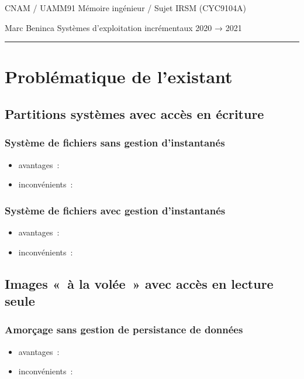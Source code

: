 \documentclass[12pt]{article}
\newcommand{\hr}{\rule{\textwidth}{1pt}}
\newenvironment{itmz}{\begin{itemize}
\setlength{\itemsep}{0em}
}{\end{itemize}}
\begin{document}
CNAM / UAMM91 \hfill Mémoire ingénieur / Sujet \hfill IRSM (CYC9104A)

Marc Beninca \hfill Systèmes d’exploitation incrémentaux \hfill 2020 → 2021

\hr

\section{Problématique de l’existant}

\subsection{Partitions systèmes avec accès en écriture}

\subsubsection{Système de fichiers sans gestion d’instantanés}

\begin{itmz}
\item{avantages :}
\item{inconvénients :}
\end{itmz}

\subsubsection{Système de fichiers avec gestion d’instantanés}

\begin{itmz}
\item{avantages :}
\item{inconvénients :}
\end{itmz}

\subsection{Images « à la volée » avec accès en lecture seule}

\subsubsection{Amorçage sans gestion de persistance de données}

\begin{itmz}
\item{avantages :}
\item{inconvénients :}
\end{itmz}
\end{document}
